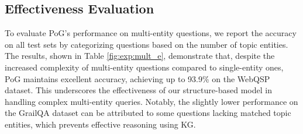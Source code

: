 \subsection{Effectiveness Evaluation}\label{exp:result_analysis}
To evaluate PoG's performance on multi-entity questions, we report the accuracy on all test sets by categorizing questions based on the number of topic entities. The results, shown in Table \ref{fig:exp:mult_e}, demonstrate that, despite the increased complexity of multi-entity questions compared to single-entity ones, PoG maintains excellent accuracy, achieving up to 93.9\% on the WebQSP dataset. This underscores the effectiveness of our structure-based model in handling complex multi-entity queries. 
Notably, the slightly lower performance on the GrailQA dataset can be attributed to some questions lacking matched topic entities, which prevents effective reasoning using KG. 
\begin{table}[t]
\caption{Performance of PoG and PoG-E on multi-entity and single-entity questions of all datasets. The symbol `-' indicates no multi-entity question inside.}\label{fig:exp:mult_e}
\setlength\tabcolsep{1.0 pt}
\end{table}

